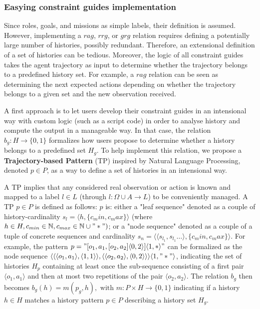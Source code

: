 \documentclass[pdflatex,sn-mathphys-num]{sn-jnl}%
\theoremstyle{thmstyleone}%
\theoremstyle{thmstyletwo}%
\theoremstyle{thmstylethree}%
\begin{document}
\subsubsection{Easying constraint guides implementation}

Since roles, goals, and missions as simple labels, their definition is assumed. However, implementing a $rag$, $rrg$, or $grg$ relation requires defining a potentially large number of histories, possibly redundant. Therefore, an extensional definition of a set of histories can be tedious. Moreover, the logic of all constraint guides takes the agent trajectory as input to determine whether the trajectory belongs to a predefined history set. For example, a $rag$ relation can be seen as determining the next expected actions depending on whether the trajectory belongs to a given set and the new observation received.

A first approach is to let users develop their constraint guides in an intensional way with custom logic (such as a script code) in order to analyse history and compute the output in a manageable way. In that case, the relation $b_g: H \to \{0,1\}$ formalizes how users propose to determine whether a history belongs to a predefined set $H_g$.
To help implement this relation, we propose a \textbf{Trajectory-based Pattern} (TP) inspired by Natural Language Processing, denoted $p \in P$, as a way to define a set of histories in an intensional way.

A TP implies that any considered real observation or action is known and mapped to a label $l \in L$ (through $l: \Omega \cup A \to L$) to be conveniently managed. A TP $p \in P$ is defined as follows: $p$ is: either a "leaf sequence" denoted as a couple of history-cardinality $s_l = \langle h, \{c_min,c_max\}\rangle$ (where $h \in H, c_{min} \in \mathbb{N}, c_{max} \in \mathbb{N} \cup "*")$; or a "node sequence" denoted as a couple of a tuple of concrete sequences and cardinality $s_n = \langle \langle s_{l_1}, s_{l_1}\dots \rangle, \{c_min,c_max\}\rangle$. For example, the pattern $p = \allowbreak "[o_1,a_1,[o_2,a_2]\langle0,2\rangle]\langle1,*\rangle"$ can be formalized as the node sequence $\allowbreak \langle \langle \langle o_1,a_1\rangle,\langle 1,1 \rangle \rangle, \langle \langle o_2,a_2 \rangle, \langle 0,2 \rangle \rangle \rangle \langle 1,"*" \rangle$, indicating the set of histories $H_p$ containing at least once the sub-sequence consisting of a first pair $\langle o_1,a_1\rangle$ and then at most two repetitions of the pair $\langle o_2,a_2 \rangle$.
The relation $b_g$ then becomes $b_g(h) = m(p_g,h), \text{ with } m: P \times H \to \{0,1\}$ indicating if a history $h \in H$ matches a history pattern $p \in P$ describing a history set $H_g$.
\end{document}
